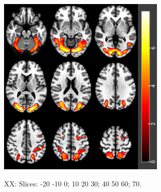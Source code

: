 \documentclass[a4paper,fleqn]{cas-sc}
\begin{document}
\begin{figure}[ht]
\begin{minipage}{0.48\textwidth}
        \includegraphics[clip, trim=0 0 0 0, width=\linewidth]{figs/OA_slice.png} %
         \label{fig:b}
    \end{minipage}
    \caption{XX: Slices: -20 -10 0; 10 20 30; 40 50 60; 70. }
    \label{fig:YA_slice}
\end{figure}
\end{document}
